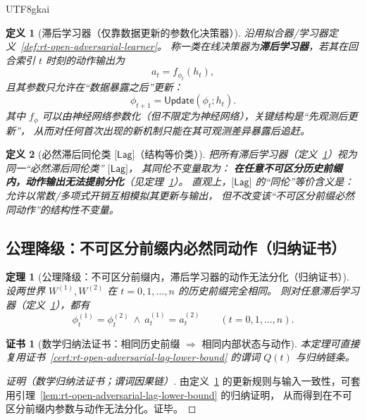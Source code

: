\documentclass[12pt]{article}
\newtheorem{definition}{定义}[section]
\newtheorem{theorem}{定理}[section]
\newtheorem{Certificate}{证书}[section]
\begin{document}
\begin{CJK*}{UTF8}{gkai}
\begin{definition}[滞后学习器（仅靠数据更新的参数化决策器）]
\label{def:lagging-learner}
沿用拟合器/学习器定义~\ref{def:rt-open-adversarial-learner}。
称一类在线决策器为\textbf{滞后学习器}，若其在回合索引 $t$ 时刻的动作输出为
\[
  a_t = f_{\phi_t}(h_t),
\]
且其参数只允许在“数据暴露之后”更新：
\[
  \phi_{t+1}=\mathsf{Update}(\phi_t;h_t).
\]
其中 $f_{\phi}$ 可以由神经网络参数化（但不限定为神经网络），关键结构是“先观测后更新”，
从而对任何首次出现的新机制只能在其可观测差异暴露后追赶。
\end{definition}

\begin{definition}[必然滞后同伦类 $\lbrack\mathsf{Lag}\rbrack$（结构等价类）]
\label{def:lag-homotopy-class}
把所有滞后学习器（定义~\ref{def:lagging-learner}）视为同一“必然滞后同伦类” $\lbrack\mathsf{Lag}\rbrack$，
其同伦不变量取为：
\textbf{在任意不可区分历史前缀内，动作输出无法提前分化}（见定理~\ref{thm:lag-indistinguishable-prefix}）。
直观上，$\lbrack\mathsf{Lag}\rbrack$ 的“同伦”等价含义是：允许以常数/多项式开销互相模拟其更新与输出，
但不改变该“不可区分前缀必然同动作”的结构性不变量。
\end{definition}

\subsection{公理降级：不可区分前缀内必然同动作（归纳证书）}
\label{sec:nn-lag-induction}

\begin{theorem}[公理降级：不可区分前缀内，滞后学习器的动作无法分化（归纳证书）]
\label{thm:lag-indistinguishable-prefix}
设两世界 $W^{(1)},W^{(2)}$ 在 $t=0,1,\dots,n$ 的历史前缀完全相同。
则对任意滞后学习器（定义~\ref{def:lagging-learner}），都有
\[
  \phi_t^{(1)}=\phi_t^{(2)}\ \wedge\ a_t^{(1)}=a_t^{(2)}\qquad (t=0,1,\dots,n).
\]
\end{theorem}

\begin{Certificate}[数学归纳法证书：相同历史前缀 $\Rightarrow$ 相同内部状态与动作]
\label{cert:lag-indistinguishable-prefix}
本定理可直接复用证书~\ref{cert:rt-open-adversarial-lag-lower-bound} 的谓词 $Q(t)$ 与归纳链条。
\end{Certificate}

\begin{proof}[证明（数学归纳法证书；谓词因果链）]
由定义~\ref{def:lagging-learner} 的更新规则与输入一致性，可套用引理~\ref{lem:rt-open-adversarial-lag-lower-bound} 的归纳证明，
从而得到在不可区分前缀内参数与动作无法分化。证毕。
\end{proof}


\end{CJK*}
\end{document}
